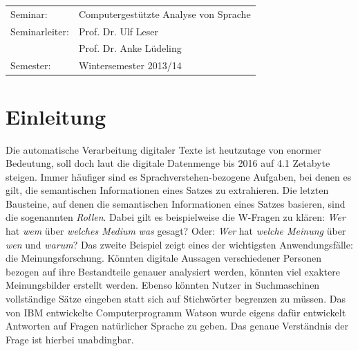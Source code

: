 \documentclass[12pt]{article}
\begin{document}
\begin{center}
\begin{Large}
		\begin{table}[h]
			\Large
			\centering
			\begin{tabular}{l l}
				Seminar: & Computergestützte Analyse von Sprache\\
				Seminarleiter: & Prof. Dr. Ulf Leser\\
				 		    & Prof. Dr. Anke Lüdeling \\
				Semester: & Wintersemester 2013/14 				 	
			\end{tabular}
		\end{table}	
	\end{Large}
\end{center}


\pagestyle{fancy} %
\fancyhf{} %
\renewcommand{\headrulewidth}{0pt} %
\renewcommand{\footrulewidth}{0pt} %
\fancyfoot[C]{\thepage} %

 \newpage
 \tableofcontents
 \vspace{1cm}
 \listoffigures
 \vspace{1cm}
 \listoftables

\newpage
{}

\section{Einleitung}

Die automatische Verarbeitung digitaler Texte ist heutzutage von enormer Bedeutung, soll doch laut \cite{gartner} die digitale Datenmenge bis 2016 auf 4.1 Zetabyte steigen. Immer häufiger sind es Sprachverstehen-bezogene Aufgaben, bei denen es gilt, die semantischen Informationen eines Satzes zu extrahieren. Die letzten Bausteine, auf denen die semantischen Informationen eines Satzes basieren, sind die sogenannten \textit{Rollen}. Dabei gilt es beispielweise die \glqq{}W\grqq{}-Fragen zu klären: \textit{Wer} hat \textit{wem} über \textit{welches Medium} \textit{was} gesagt? Oder: \textit{Wer} hat \textit{welche Meinung} über \textit{wen} und \textit{warum}? Das zweite Beispiel zeigt eines der wichtigsten Anwendungsfälle: die Meinungsforschung. Könnten digitale Aussagen verschiedener Personen bezogen auf ihre Bestandteile genauer analysiert werden, könnten viel exaktere Meinungsbilder erstellt werden. Ebenso könnten Nutzer in Suchmaschinen vollständige Sätze eingeben statt sich auf Stichwörter begrenzen zu müssen. Das von IBM entwickelte Computerprogramm Watson \citep{ibmWatson} wurde eigens dafür entwickelt Antworten auf Fragen natürlicher Sprache zu geben. Das genaue Verständnis der Frage ist hierbei unabdingbar.
\end{document}
